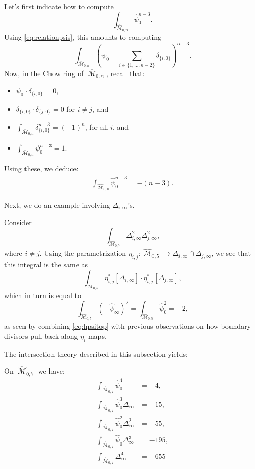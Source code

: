 \documentclass[12pt,reqno]{amsart}
\DeclareMathOperator{\M}{\mathcal{M}}
\renewcommand{\to}{{\longrightarrow}}
\numberwithin{equation}{section}
\newcommand{\hpsi}{\widehat{\psi}}
\newcommand{\hM}{\widehat{\M}}
\renewcommand {\o}[1]{\overline{#1}}
\begin{document}
\begin{example}
  \label{ex:toppsi}
  Let's first indicate how to
  compute $$\int_{\hM_{0,n}}\hpsi_{0}^{n-3}.$$ Using
  \eqref{eq:relationpsis}, this amounts to computing
  $$\int_{\o{\M}_{0,n}} \left(\psi_{0} - \sum_{i \in \{1, \dots, n-2\}} \delta_{\{i,0\}}\right)^{n-3}.$$
  Now, in the Chow ring of $\o{\M}_{0,n}$, recall that:
  \begin{itemize}
  \item $\psi_{0} \cdot \delta_{\{i,0\}} = 0$, 
  \item $\delta_{\{i,0\}} \cdot \delta_{\{j,0\}} = 0$ for $i \neq j$,
    and
  \item $\int_{\o{\M}_{0,n}}\delta_{\{i,0\}}^{n-3} = (-1)^{n}$, for
    all $i$, and
  \item $\int_{\o{\M}_{0,n}} \psi_{0}^{n-3} = 1$.
  \end{itemize}

  Using these, we deduce:
  \begin{align}
    \label{eq:hpsitop}
    \int_{\hM_{0,n}}\hpsi_{0}^{n-3} = -(n-3). 
  \end{align}
\end{example}

Next, we do an example involving $\Delta_{i, \infty}$'s.

\begin{example}
  Consider
  $$\int_{\hM_{0,7}} \Delta_{i, \infty}^{2}\Delta_{j, \infty}^{2},$$
  where $i \neq j$.  Using the parametrization
  $\eta_{i,j} : \hM_{0,5} \to \Delta_{i,\infty} \cap
  \Delta_{j,\infty}$, we see that this integral is the same as
  $$\int_{\hM_{0,5}}\eta_{i,j}^{*}[\Delta_{i, \infty}] \cdot \eta_{i,j}^{*}[\Delta_{j, \infty}],$$
  which in turn is equal to
  $$\int_{\hM_{0,5}}(-\hpsi_{\infty})^{2} = \int_{\hM_{0,5}}\hpsi_{0}^{2} = -2,$$
  as seen by combining \eqref{eq:hpsitop} with previous observations
  on how boundary divisors pull back along $\eta_{i}$ maps.
\end{example}

The intersection theory described in this subsection yields:

\begin{lemma}
  \label{lemma:monomials} On $\hM_{0,7}$ we have:
  \begin{align}
    \int_{\hM_{0,7}}\widehat{\psi}_{0}^{4}& = -4, \\ \nonumber
    \int_{\hM_{0,7}}\widehat{\psi}_{0}^{3}\Delta_{\infty}& = -15, \\ \nonumber
    \int_{\hM_{0,7}}\widehat{\psi}_{0}^{2}\Delta_{\infty}^{2}& = -55, \\ \nonumber
    \int_{\hM_{0,7}}\widehat{\psi}_{0}\Delta_{\infty}^{3}& = -195, \\ \nonumber
    \int_{\hM_{0,7}}\Delta_{\infty}^{4}& = -655
  \end{align}
\end{lemma}
\end{document}
